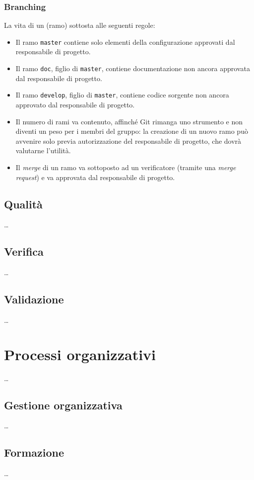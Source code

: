 \subsubsection{Branching} La vita di un  (ramo) sottosta alle seguenti regole:
\begin{itemize}
	\item Il ramo \texttt{master} contiene solo elementi della configurazione approvati dal responsabile di progetto.
	\item Il ramo \texttt{doc}, figlio di \texttt{master}, contiene documentazione non ancora approvata dal responsabile di progetto.
	\item Il ramo \texttt{develop}, figlio di \texttt{master}, contiene codice sorgente non ancora approvato dal responsabile di progetto.
	\item Il numero di rami va contenuto, affinché Git rimanga uno strumento e non diventi un peso per i membri del gruppo: la creazione di un nuovo ramo può avvenire solo previa autorizzazione del responsabile di progetto, che dovrà valutarne l'utilità.
	\item Il \emph{merge} di un ramo va sottoposto ad un verificatore (tramite una \emph{merge request}) e va approvata dal responsabile di progetto.
\end{itemize}

\subsection{Qualità} \dots

\subsection{Verifica} \dots

\subsection{Validazione} \dots




\section{Processi organizzativi} \dots

\subsection{Gestione organizzativa} \dots

\subsection{Formazione} \dots


